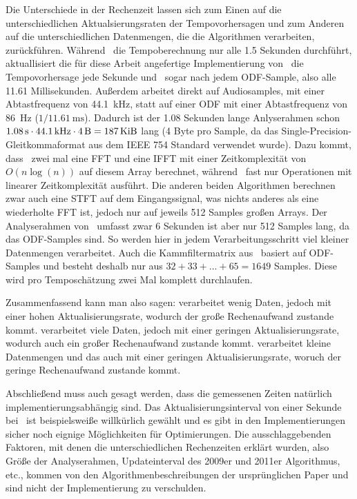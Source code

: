 {{		%
		Die Unterschiede in der Rechenzeit lassen sich zum Einen auf die unterschiedlichen Aktualsierungsraten der Tempovorhersagen
			und zum Anderen auf die unterschiedlichen Datenmengen,
			die die Algorithmen verarbeiten,
			zurückführen.
		Während~\cite{2009_DaPlSt} die Tempoberechnung nur alle \num{1.5} Sekunden durchführt,
			aktuallisiert die für diese Arbeit angefertige Implementierung von~\cite{2001_BeatThis} die Tempovorhersage jede Sekunde
			und~\cite{2011_PlRoSt} sogar nach jedem ODF-Sample,
			also alle \num{11.61} Millisekunden.
		Au{\ss}erdem arbeitet \cite{2001_BeatThis} direkt auf Audiosamples,
			mit einer Abtastfrequenz von \SI{44.1}{\kilo\hertz},
			statt auf einer ODF mit einer Abtastfrequenz von \SI{86}{\hertz} ($1 / \SI{11.61}{\milli\second}$).
		Dadurch ist der \num{1.08} Sekunden lange Anlyserahmen schon $\SI{1.08}{\second} \cdot \SI{44.1}{\kilo\hertz} \cdot \SI{4}{\byte} = \SI{187}{\kibi\byte}$ lang (\num{4} Byte pro Sample, da das Single-Precision-Gleitkommaformat aus dem IEEE 754 Standard verwendet wurde).
		Dazu kommt,
			dass~\cite{2001_BeatThis} zwei mal eine FFT und eine IFFT mit einer Zeitkomplexität von $O(n\log(n))$ auf diesem Array berechnet,
			während~\cite{2009_DaPlSt} fast nur Operationen mit linearer Zeitkomplexität ausführt.
		Die anderen beiden Algorithmen berechnen zwar auch eine STFT auf dem Eingangssignal,
			was nichts anderes als eine wiederholte FFT ist,
			jedoch nur auf jeweils \num{512} Samples gro{\ss}en Arrays.
		Der Analyserahmen von~\cite{2009_DaPlSt} umfasst zwar \num{6} Sekunden
			ist aber nur \num{512} Samples lang,
			da das ODF-Samples sind.
		So werden hier in jedem Verarbeitungsschritt viel kleiner Datenmengen verarbeitet.
		Auch die Kammfiltermatrix aus~\cite{2011_PlRoSt} basiert auf ODF-Samples
			und besteht deshalb nur aus $32 + 33 + ... + 65 = 1649$ Samples.
		Diese wird pro Temposchätzung zwei Mal komplett durchlaufen.

		Zusammenfassend kann man also sagen:
		\cite{2011_PlRoSt} verarbeitet wenig Daten,
			jedoch mit einer hohen Aktualisierungsrate,
			wodurch der gro{\ss}e Rechenaufwand zustande kommt.
		\cite{2001_BeatThis} verarbeitet viele Daten,
			jedoch mit einer geringen Aktualisierungsrate,
			wodurch auch ein gro{\ss}er Rechenaufwand zustande kommt.
		\cite{2009_DaPlSt} verarbeitet kleine Datenmengen
			und das auch mit einer geringen Aktualisierungsrate,
			woruch der geringe Rechenaufwand zustande kommt.

		Abschlie{\ss}end muss auch gesagt werden,
			dass die gemessenen Zeiten natürlich implementierungsabhängig sind.
		Das Aktualisierungsinterval von einer Sekunde bei~\cite{2001_BeatThis} ist beispielswei{\ss}e willkürlich gewählt
			und es gibt in den Implementierungen sicher noch eignige Möglichkeiten für Optimierungen.
		Die ausschlaggebenden Faktoren,
			mit denen die unterschiedlichen Rechenzeiten erklärt wurden,
			also Grö{\ss}e der Analyserahmen,
			Updateinterval des 2009er und 2011er Algorithmus,
			etc.,
			kommen von den Algorithmenbeschreibungen der ursprünglichen Paper
			und sind nicht der Implementierung zu verschulden.
	}
}
